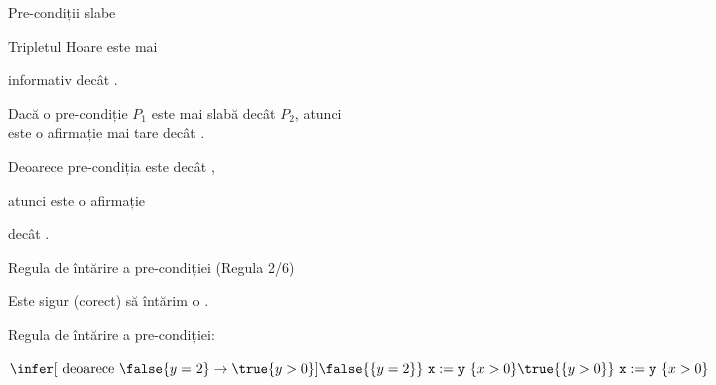 \begin{frame}{Pre-condiții slabe}

\begin{example}
Tripletul Hoare  este mai 

informativ decât .
\end{example}

\medskip
Dacă o \alert{pre-condiție} $P_1$ este \alert{mai slabă} decât $P_2$, atunci \\  este o afirmație \alert{mai tare} decât .

\medskip
\begin{example}
Deoarece pre-condiția  este  decât ,

atunci  este o afirmație 

decât  . 
\end{example}
\end{frame}

\begin{frame}{Regula de întărire a pre-condiției (Regula 2/6)}

Este sigur (corect) să \alert{întărim} o .

\alert{Regula de întărire a pre-condiției:}
\begin{center}
\end{center}

\begin{example}
\begin{center}
$\infer[\mbox{ deoarece }\false{y=2} \to \true{y>0}]{\false{\{y=2\}}\ \mathtt{x := y}\ \{x>0\}}{\true{\{y>0\}}\ \mathtt{x := y}\ \{x>0\}}$
\end{center}

\end{example}
\end{frame}

